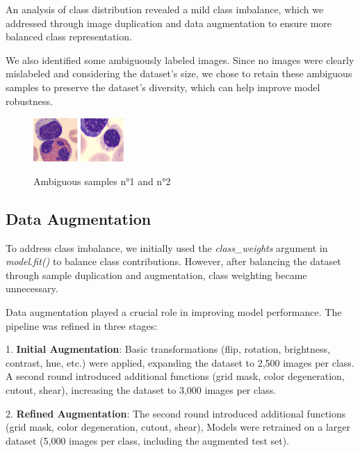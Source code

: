 \documentclass[11pt]{article}
\begin{document}
\begin{multicols}{2}
        An analysis of class distribution revealed a mild class imbalance, which we addressed through image duplication and data augmentation to ensure more balanced class representation.
        
        We also identified some ambiguously labeled images. Since no images were clearly mislabeled and considering the dataset's size, we chose to retain these ambiguous samples to preserve the dataset's diversity, which can help improve model robustness.
        
        \begin{figure}[H]
            \centering
            \includegraphics[width=0.15\textwidth]{images/ambiguous1.png}
            \includegraphics[width=0.15\textwidth]{images/ambiguous2.png}
            \caption{\small Ambiguous samples n°1 and n°2}
        \end{figure}
        
        \subsection{Data Augmentation}
        
        To address class imbalance, we initially used the \textit{class\_weights} argument in \textit{model.fit()} to balance class contributions. However, after balancing the dataset through sample duplication and augmentation, class weighting became unnecessary.
        
        Data augmentation played a crucial role in improving model performance. The pipeline was refined in three stages:
        
        1. \textbf{Initial Augmentation}: Basic transformations (flip, rotation, brightness, contrast, hue, etc.) were applied, expanding the dataset to 2,500 images per class. A second round introduced additional functions (grid mask, color degeneration, cutout, shear), increasing the dataset to 3,000 images per class.
        
        2. \textbf{Refined Augmentation}: The second round introduced additional functions (grid mask, color degeneration, cutout, shear), Models were retrained on a larger dataset (5,000 images per class, including the augmented test set).
        

\end{multicols}
\end{document}
